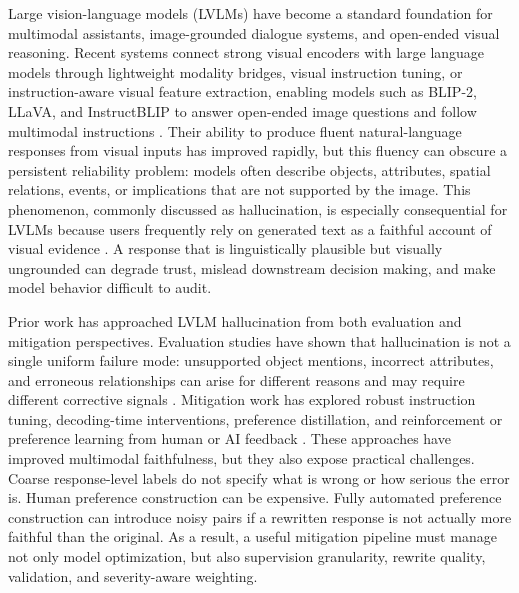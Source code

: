\documentclass{article}
\begin{document}
Large vision-language models (LVLMs) have become a standard foundation for multimodal assistants, image-grounded dialogue systems, and open-ended visual reasoning. Recent systems connect strong visual encoders with large language models through lightweight modality bridges, visual instruction tuning, or instruction-aware visual feature extraction, enabling models such as BLIP-2, LLaVA, and InstructBLIP to answer open-ended image questions and follow multimodal instructions \citep{li2023blip2,liu2023visual,dai2023instructblip}. Their ability to produce fluent natural-language responses from visual inputs has improved rapidly, but this fluency can obscure a persistent reliability problem: models often describe objects, attributes, spatial relations, events, or implications that are not supported by the image. This phenomenon, commonly discussed as hallucination, is especially consequential for LVLMs because users frequently rely on generated text as a faithful account of visual evidence \citep{liu2024survey,rohrbach2018object}. A response that is linguistically plausible but visually ungrounded can degrade trust, mislead downstream decision making, and make model behavior difficult to audit.

Prior work has approached LVLM hallucination from both evaluation and mitigation perspectives. Evaluation studies have shown that hallucination is not a single uniform failure mode: unsupported object mentions, incorrect attributes, and erroneous relationships can arise for different reasons and may require different corrective signals \citep{rohrbach2018object,gunjal2024detecting,chen2024unified}. Mitigation work has explored robust instruction tuning, decoding-time interventions, preference distillation, and reinforcement or preference learning from human or AI feedback \citep{liu2024robust,zhou2024analyzing,li2023silkie,yu2024rlhfv}. These approaches have improved multimodal faithfulness, but they also expose practical challenges. Coarse response-level labels do not specify what is wrong or how serious the error is. Human preference construction can be expensive. Fully automated preference construction can introduce noisy pairs if a rewritten response is not actually more faithful than the original. As a result, a useful mitigation pipeline must manage not only model optimization, but also supervision granularity, rewrite quality, validation, and severity-aware weighting.
\end{document}
